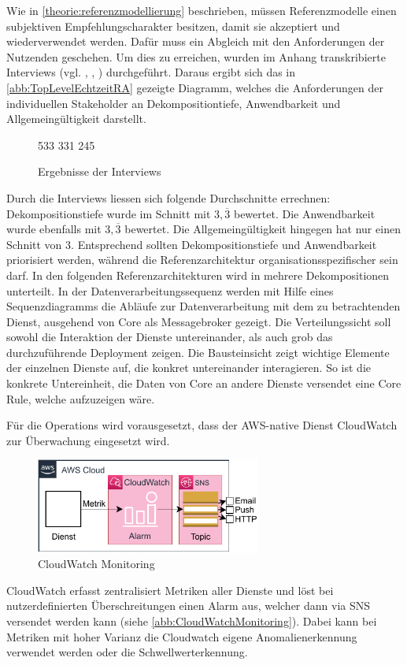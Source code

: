 Wie in \autoref{theorie:referenzmodellierung} beschrieben, müssen Referenzmodelle einen subjektiven Empfehlungscharakter besitzen, damit sie akzeptiert und wiederverwendet werden. Dafür muss ein Abgleich mit den Anforderungen der Nutzenden geschehen. Um dies zu erreichen, wurden im Anhang transkribierte Interviews (vgl. , , ) durchgeführt. Daraus ergibt sich das in \autoref{abb:TopLevelEchtzeitRA} gezeigte Diagramm, welches die Anforderungen der individuellen Stakeholder an Dekompositiontiefe, Anwendbarkeit und Allgemeingültigkeit darstellt.

\begin{figure}[H]
\centering
\spideroverview
{5}{3}{3}
{3}{3}{1}
{2}{4}{5}
\caption{Ergebnisse der Interviews}
\label{abb:DimensionenUebersicht}
\end{figure}
Durch die Interviews liessen sich folgende Durchschnitte errechnen: Dekompositionstiefe wurde im Schnitt mit $3,\overline{3}$ bewertet. Die Anwendbarkeit wurde ebenfalls mit $3,\overline{3}$ bewertet. Die Allgemeingültigkeit hingegen hat nur einen Schnitt von $3$. Entsprechend sollten Dekompositionstiefe und Anwendbarkeit priorisiert werden, während die Referenzarchitektur organisationsspezifischer sein darf. 
In den folgenden Referenzarchitekturen wird in mehrere Dekompositionen unterteilt. In der Datenverarbeitungssequenz werden mit Hilfe eines Sequenzdiagramms die Abläufe zur Datenverarbeitung mit dem zu betrachtenden Dienst, ausgehend von \AWSIOT{} Core als Messagebroker gezeigt.
Die Verteilungssicht soll sowohl die Interaktion der Dienste untereinander, als auch grob das durchzuführende Deployment zeigen. Die Bausteinsicht zeigt wichtige Elemente der einzelnen Dienste auf, die konkret untereinander interagieren. So ist die konkrete Untereinheit, die Daten von \AWSIOT{} Core an andere Dienste versendet eine \AWSIOT{} Core Rule, welche aufzuzeigen wäre. 

Für die Operations wird vorausgesetzt, dass der \ac{AWS}-native Dienst CloudWatch zur Überwachung eingesetzt wird. 
\begin{figure}[H]
\centering
\includegraphics[width=0.66\textwidth]{graphics/CloudWatch-Monitoring}
\caption{CloudWatch Monitoring}
\label{abb:CloudWatchMonitoring}
\end{figure}
CloudWatch erfasst zentralisiert Metriken aller Dienste und löst bei nutzerdefinierten Überschreitungen einen Alarm aus, welcher dann via \ac{SNS} versendet werden kann (siehe \autoref{abb:CloudWatchMonitoring}). Dabei kann bei Metriken mit hoher Varianz die Cloudwatch eigene Anomalienerkennung verwendet werden oder die Schwellwerterkennung.




